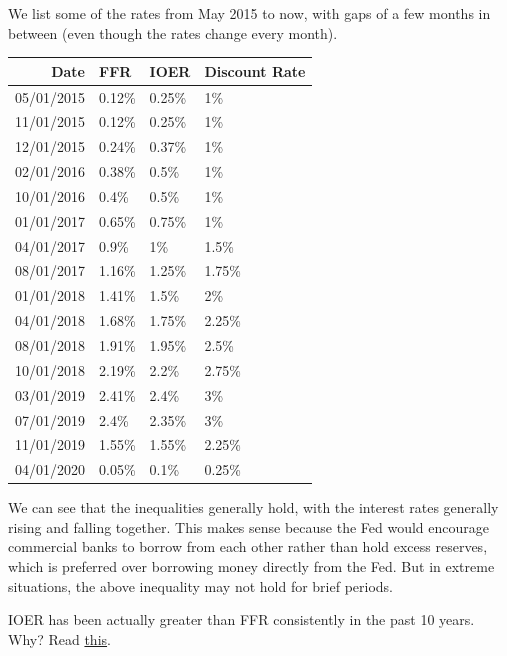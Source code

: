 \documentclass{article}
\begin{document}
    \begin{example}
      \label{ex:recent-rates}
      We list some of the rates from May 2015 to now, with gaps of a few months in between (even though the rates change every month). 
      \begin{center}
      \begin{tabular}{r|l|l|l}
        Date & FFR& IOER & Discount Rate\\
        \hline
        05/01/2015 & 0.12\% & 0.25\% & 1\% \\
        11/01/2015 & 0.12\% & 0.25\% & 1\% \\
        12/01/2015 & 0.24\% & 0.37\% & 1\% \\
        02/01/2016 & 0.38\% & 0.5\% & 1\% \\
        10/01/2016 & 0.4\% & 0.5\% & 1\% \\
        01/01/2017 & 0.65\% & 0.75\% & 1\% \\
        04/01/2017 & 0.9\% & 1\% & 1.5\% \\
        08/01/2017 & 1.16\% & 1.25\% & 1.75\% \\
        01/01/2018 & 1.41\% & 1.5\% & 2\% \\
        04/01/2018 & 1.68\% & 1.75\% & 2.25\% \\
        08/01/2018 & 1.91\% & 1.95\% & 2.5\% \\
        10/01/2018 & 2.19\% & 2.2\% & 2.75\% \\
        03/01/2019 & 2.41\% & 2.4\% & 3\% \\
        07/01/2019 & 2.4\% & 2.35\% & 3\% \\
        11/01/2019 & 1.55\% & 1.55\% & 2.25\% \\
        04/01/2020 & 0.05\% & 0.1\% & 0.25\% 
      \end{tabular}
      \end{center}
      We can see that the inequalities generally hold, with the interest rates generally rising and falling together. This makes sense because the Fed would encourage commercial banks to borrow from each other rather than hold excess reserves, which is preferred over borrowing money directly from the Fed. But in extreme situations, the above inequality may not hold for brief periods. 
    \end{example}

    \begin{question}
      IOER has been actually greater than FFR consistently in the past 10 years. Why? Read \href{https://www.clevelandfed.org/publications/economic-commentary/2017/ec-201707-the-federal-funds-market-since-the-financial-crisis}{this}. 
    \end{question}
\end{document}
